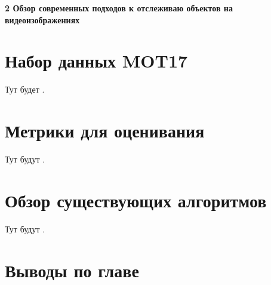 \newpage
\begin{flushleft}
  \textbf{\large 2 Обзор современных подходов к отслеживаю объектов на видеоизображениях}
\end{flushleft}

\section{Набор данных MOT17}
Тут будет \cite{dendorfer2021motchallenge}.
\section{Метрики для оценивания}
Тут будут \cite{luiten2021hota, bernardin2008evaluating, ristani2016performance}.
\section{Обзор существующих алгоритмов }
Тут будут \cite{aharon2022bot, cao2023observation, du2023strongsort, maggiolino2023deep, stadler2023improved, zhang2022bytetrack}.

\section{Выводы по главе}
